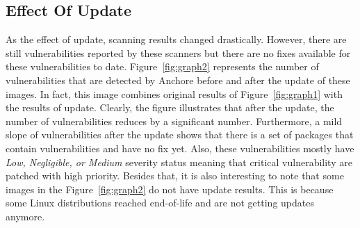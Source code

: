 \documentclass[a4paper,num-refs]{oup-contemporary}
\begin{document}
\subsection{Effect Of Update}

As the effect of update,
scanning results changed drastically. However, there are still
vulnerabilities reported by these scanners but there are no fixes available for these vulnerabilities
to date.
Figure~\ref{fig:graph2} represents the number of vulnerabilities that are detected by Anchore before and after 
the update of these images. 
In fact, this image combines original results of Figure~\ref{fig:graph1} with the results of update.
Clearly, the figure illustrates that after the update, the number of vulnerabilities reduces by a
significant number. Furthermore, a mild slope of vulnerabilities after the update shows that
there is a set of packages that contain vulnerabilities and have no fix yet. Also, these
vulnerabilities mostly have \textit{Low, Negligible, or Medium} severity status meaning that
critical vulnerability are patched with high priority.
Besides that, it is also interesting to note that some images in the Figure~\ref{fig:graph2}
do not have update results. This is because some Linux distributions reached end-of-life and
are not getting updates anymore.

\end{document}
